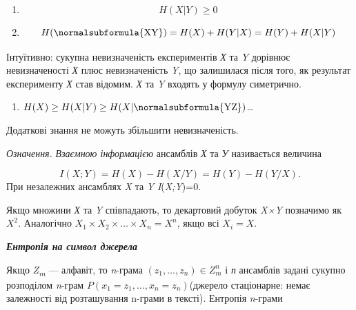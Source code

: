 \liststyleWWviiiNumxxxix
\setcounter{saveenum}{\value{enumi}}
\begin{enumerate}
\setcounter{enumi}{\value{saveenum}}
\item \begin{equation*}
{H(X|Y)\ge 0}
\end{equation*}
\item \begin{equation*}
{H(\normalsubformula{\text{XY}})=H(X)+H(Y|X)=H(Y)+H(X|Y)}
\end{equation*}
\end{enumerate}
Інтуїтивно: сукупна невизначеність експериментів \textit{Х} та \textit{Y}
дорівнює невизначеності \textit{Х} плюс невизначеність \textit{Y}, що
залишилася після того, як результат експерименту \textit{Х} став відомим.
\textit{Х} та \textit{Y} входять у формулу симетрично.

\liststyleWWviiiNumxxxix
\setcounter{saveenum}{\value{enumi}}
\begin{enumerate}
\setcounter{enumi}{\value{saveenum}}
\item  ${H(X)\ge H(X|Y)\ge H(X|\normalsubformula{\text{YZ}})}$…
\end{enumerate}
Додаткові знання не можуть збільшити невизначеність.


\bigskip

\textit{Означення.}\textit{  Взаємною інформацією} ансамблів \textit{Х} та
\textit{У }називається величина 

\begin{equation*}
{I(X;Y)=H(X)-H(X/Y)=H(Y)-H(Y/X)\text{.}}
\end{equation*}
При незалежних ансамблях \textit{X} та \textit{Y} 
\textit{I}(\textit{X}\textit{;}\textit{Y})=0.


\bigskip

Якщо множини \textit{Х} та \textit{Y} співпадають, то декартовий добуток
\textit{X×Y} позначимо як  ${X^{{2}}}$. Аналогічно  ${X_{{1}}\times
X_{{2}}\times \dots\times X_{{n}}=X^{{n}}}$, якщо всі 
${X_{{i}}=X}$.


\bigskip


\bigskip

{\centering\bfseries\itshape
Ентропія на символ джерела
\par}


\bigskip


\bigskip

Якщо \textit{Z}\textit{\textsubscript{m}} --- алфавіт, то \textit{n}{}-грама 
${(z_{{1}},\dots,z_{{n}})\in Z_{{m}}^{{n}}}$ і \textit{п}
ансамблів задані сукупно розподілом \textit{n}{}-грам 
${P(x_{{1}}=z_{{1}},\dots,x_{{n}}=z_{{n}})}$(джерело
стаціонарне: немає залежності від розташування n-грами в тексті). Ентропія
\textit{n}{}-грами

